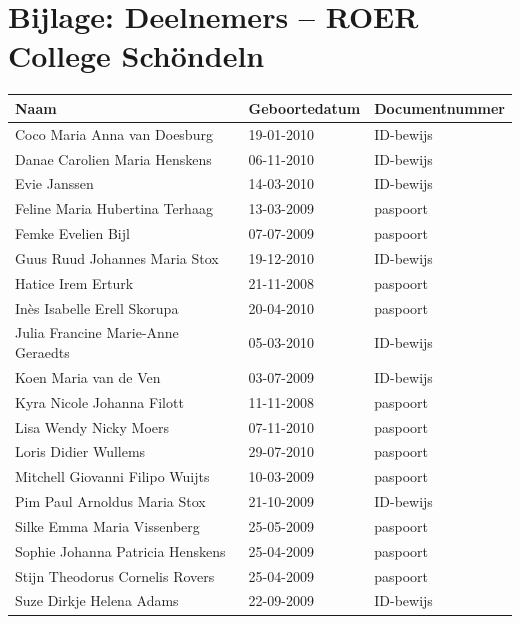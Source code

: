 \documentclass[11pt,a4paper]{letter}
\begin{document}
\section*{Bijlage: Deelnemers – ROER College Schöndeln}
\begin{tabular}{|l|l|l|}
\hline
\textbf{Naam} & \textbf{Geboortedatum} & \textbf{Documentnummer} \\ \hline
Coco Maria Anna van Doesburg & 19-01-2010 & ID-bewijs \\ \hline
Danae Carolien Maria Henskens & 06-11-2010 & ID-bewijs \\ \hline
Evie Janssen & 14-03-2010 & ID-bewijs \\ \hline
Feline Maria Hubertina Terhaag & 13-03-2009 & paspoort \\ \hline
Femke Evelien Bijl & 07-07-2009 & paspoort \\ \hline
Guus Ruud Johannes Maria Stox & 19-12-2010 & ID-bewijs \\ \hline
Hatice Irem Erturk & 21-11-2008 & paspoort \\ \hline
Inès Isabelle Erell Skorupa & 20-04-2010 & paspoort \\ \hline
Julia Francine Marie-Anne Geraedts & 05-03-2010 & ID-bewijs \\ \hline
Koen Maria van de Ven & 03-07-2009 & ID-bewijs \\ \hline
Kyra Nicole Johanna Filott & 11-11-2008 & paspoort \\ \hline
Lisa Wendy Nicky Moers & 07-11-2010 & paspoort \\ \hline
Loris Didier Wullems & 29-07-2010 & paspoort \\ \hline
Mitchell Giovanni Filipo Wuijts & 10-03-2009 & paspoort \\ \hline
Pim Paul Arnoldus Maria Stox & 21-10-2009 & ID-bewijs \\ \hline
Silke Emma Maria Vissenberg & 25-05-2009 & paspoort \\ \hline
Sophie Johanna Patricia Henskens & 25-04-2009 & paspoort \\ \hline
Stijn Theodorus Cornelis Rovers & 25-04-2009 & paspoort \\ \hline
Suze Dirkje Helena Adams & 22-09-2009 & ID-bewijs \\ \hline
\end{tabular}
\end{document}
